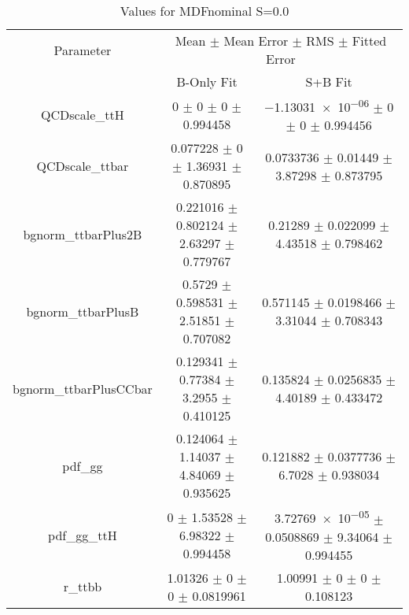 \begin{table}
\centering
\caption{Values for MDFnominal S=0.0}
\begin{tabular}{ccc}
\toprule
Parameter & \multicolumn{2}{c}{Mean $\pm$ Mean Error $\pm$ RMS $\pm$ Fitted Error}\\
 & B-Only Fit & S+B Fit\\
\midrule
QCDscale\_ttH & \num{0} $\pm$ \num{0} $\pm$ \num{0} $\pm$ \num{0.994458} & \num{-1.13031e-06} $\pm$ \num{0} $\pm$ \num{0} $\pm$ \num{0.994456}\\
QCDscale\_ttbar & \num{0.077228} $\pm$ \num{0} $\pm$ \num{1.36931} $\pm$ \num{0.870895} & \num{0.0733736} $\pm$ \num{0.01449} $\pm$ \num{3.87298} $\pm$ \num{0.873795}\\
bgnorm\_ttbarPlus2B & \num{0.221016} $\pm$ \num{0.802124} $\pm$ \num{2.63297} $\pm$ \num{0.779767} & \num{0.21289} $\pm$ \num{0.022099} $\pm$ \num{4.43518} $\pm$ \num{0.798462}\\
bgnorm\_ttbarPlusB & \num{0.5729} $\pm$ \num{0.598531} $\pm$ \num{2.51851} $\pm$ \num{0.707082} & \num{0.571145} $\pm$ \num{0.0198466} $\pm$ \num{3.31044} $\pm$ \num{0.708343}\\
bgnorm\_ttbarPlusCCbar & \num{0.129341} $\pm$ \num{0.77384} $\pm$ \num{3.2955} $\pm$ \num{0.410125} & \num{0.135824} $\pm$ \num{0.0256835} $\pm$ \num{4.40189} $\pm$ \num{0.433472}\\
pdf\_gg & \num{0.124064} $\pm$ \num{1.14037} $\pm$ \num{4.84069} $\pm$ \num{0.935625} & \num{0.121882} $\pm$ \num{0.0377736} $\pm$ \num{6.7028} $\pm$ \num{0.938034}\\
pdf\_gg\_ttH & \num{0} $\pm$ \num{1.53528} $\pm$ \num{6.98322} $\pm$ \num{0.994458} & \num{3.72769e-05} $\pm$ \num{0.0508869} $\pm$ \num{9.34064} $\pm$ \num{0.994455}\\
r\_ttbb & \num{1.01326} $\pm$ \num{0} $\pm$ \num{0} $\pm$ \num{0.0819961} & \num{1.00991} $\pm$ \num{0} $\pm$ \num{0} $\pm$ \num{0.108123}\\
\bottomrule
\end{tabular}
\end{table}